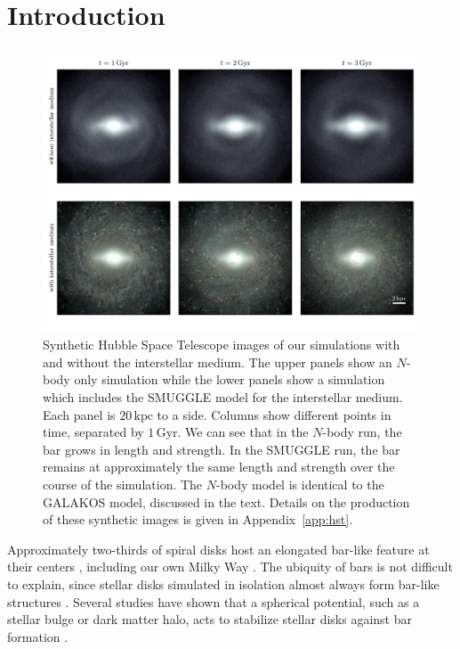 \documentclass[twocolumn,linenumbers]{aastex631}
\newcommand{\Nbody}{$N$-body}
\newcommand{\SMUGGLE}{SMUGGLE}
\begin{document}
\section{Introduction}
\label{sec:intro}
\begin{figure}
    \centering
    \includegraphics[width=\textwidth]{fig/mockHST.pdf}
    \caption{Synthetic Hubble Space Telescope images of our simulations with and
    without the interstellar medium. The upper panels show an \Nbody{} only
    simulation while the lower panels show a simulation which includes the
    \SMUGGLE{} model for the interstellar medium. Each panel is $20\,\textrm{kpc}$
    to a side. Columns show different points in time, separated by
    $1\,\textrm{Gyr}$. We can see that in the \Nbody{} run, the bar grows in
    length and strength. In the \SMUGGLE{} run, the bar remains at approximately
    the same length and strength over the course of the simulation. The \Nbody{}
    model is identical to the GALAKOS model, discussed in the text. Details on
    the production of these synthetic images is given in Appendix~\ref{app:hst}.}\label{fig:overview}
\end{figure}

Approximately two-thirds of spiral disks host an elongated bar-like feature at
their centers \citep{2000AJ....119..536E, 2007ApJ...657..790M}, including our
own Milky Way \citep{1957AJ.....62...19J, 1991ApJ...379..631B}. The ubiquity of
bars is not difficult to explain, since stellar disks simulated in isolation
almost always form bar-like structures \citep{1971ApJ...168..343H}. Several
studies have shown that a spherical potential, such as a stellar bulge or dark
matter halo, acts to stabilize stellar disks against bar formation
\citep[e.g.,][]{1973ApJ...186..467O, 1976AJ.....81...30H}.
\end{document}
